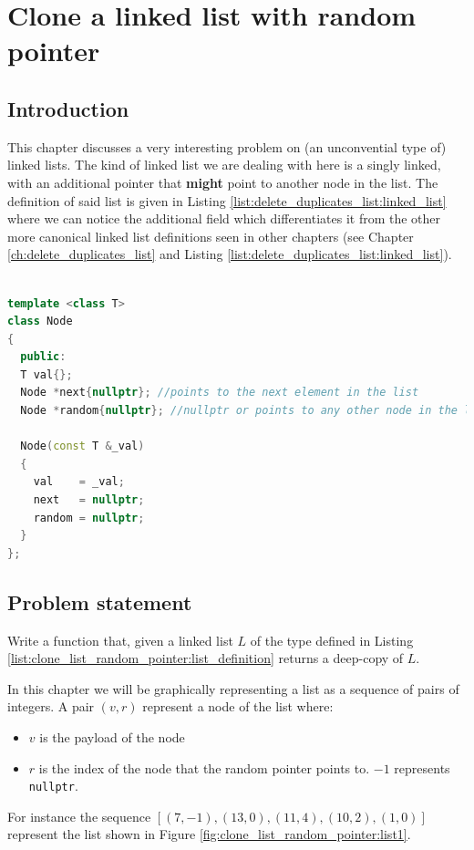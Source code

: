 %

\chapter{Clone a linked list with random pointer}
\label{ch:clone_list_random_pointer}
\section*{Introduction}
This chapter discusses a very interesting problem on (an unconvential type of) linked lists.
The kind of linked list we are dealing with here is a singly linked, with an additional pointer that \textbf{might} point to another node in the list. 
The \CC definition of said list is given in Listing \ref{list:delete_duplicates_list:linked_list} where we can notice the additional field  which differentiates it from the other more canonical linked list definitions seen in other chapters (see Chapter \ref{ch:delete_duplicates_list} and Listing \ref{list:delete_duplicates_list:linked_list}).

\begin{lstlisting}[language=c++, caption={Definition of a linked list with a pointer to a \textit{random} node.},label=list:delete_duplicates_list:linked_list]

template <class T> 
class Node
{
  public:
  T val{};
  Node *next{nullptr}; //points to the next element in the list
  Node *random{nullptr}; //nullptr or points to any other node in the list.

  Node(const T &_val)
  {
    val    = _val;
    next   = nullptr;
    random = nullptr;
  }
};
\end{lstlisting}

\section{Problem statement}
\begin{exercise}
Write a function that, given a linked list $L$ of the type defined in Listing \ref{list:clone_list_random_pointer:list_definition} returns a deep-copy of $L$.

In this chapter we will be graphically representing a list as a sequence of pairs of integers. A pair $(v,r)$ represent a node of the list where:
\begin{itemize}
	\item $v$ is the payload of the node
	\item $r$ is the index of the node that the random pointer points to. $-1$ represents \lstinline[columns=fixed]{nullptr}.
\end{itemize} 
For instance the sequence $[(7,-1),(13,0),(11,4),(10,2),(1,0)]$ represent the list shown in Figure \ref{fig:clone_list_random_pointer:list1}.
\end{exercise}

